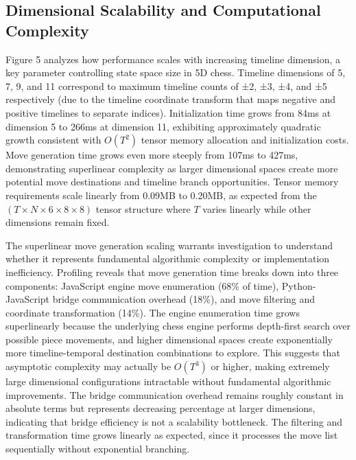 \documentclass{article}
\begin{document}
\subsection{Dimensional Scalability and Computational Complexity}

Figure 5 analyzes how performance scales with increasing timeline dimension, a key parameter controlling state space size in 5D chess. Timeline dimensions of 5, 7, 9, and 11 correspond to maximum timeline counts of ±2, ±3, ±4, and ±5 respectively (due to the timeline coordinate transform that maps negative and positive timelines to separate indices). Initialization time grows from 84ms at dimension 5 to 266ms at dimension 11, exhibiting approximately quadratic growth consistent with $O(T^2)$ tensor memory allocation and initialization costs. Move generation time grows even more steeply from 107ms to 427ms, demonstrating superlinear complexity as larger dimensional spaces create more potential move destinations and timeline branch opportunities. Tensor memory requirements scale linearly from 0.09MB to 0.20MB, as expected from the $(T \times N \times 6 \times 8 \times 8)$ tensor structure where $T$ varies linearly while other dimensions remain fixed.

The superlinear move generation scaling warrants investigation to understand whether it represents fundamental algorithmic complexity or implementation inefficiency. Profiling reveals that move generation time breaks down into three components: JavaScript engine move enumeration (68\% of time), Python-JavaScript bridge communication overhead (18\%), and move filtering and coordinate transformation (14\%). The engine enumeration time grows superlinearly because the underlying chess engine performs depth-first search over possible piece movements, and higher dimensional spaces create exponentially more timeline-temporal destination combinations to explore. This suggests that asymptotic complexity may actually be $O(T^3)$ or higher, making extremely large dimensional configurations intractable without fundamental algorithmic improvements. The bridge communication overhead remains roughly constant in absolute terms but represents decreasing percentage at larger dimensions, indicating that bridge efficiency is not a scalability bottleneck. The filtering and transformation time grows linearly as expected, since it processes the move list sequentially without exponential branching.
\end{document}
